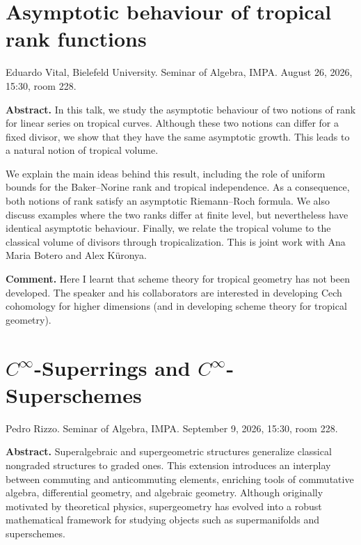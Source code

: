 \section{Asymptotic behaviour of tropical
rank functions}
\label{section-asymptotic-tropical-rank}

\noindent
Eduardo Vital, Bielefeld University.
Seminar of Algebra, IMPA.
August 26, 2026, 15:30, room 228.

\medskip\noindent
{\bf Abstract.} In this talk, we study the
asymptotic behaviour of two notions of rank
for linear series on tropical curves.
Although these two notions can differ for a
fixed divisor, we show that they have the
same asymptotic growth. This leads to a
natural notion of tropical volume.

We explain the main ideas behind this
result, including the role of uniform bounds
for the Baker--Norine rank and tropical
independence. As a consequence, both notions
of rank satisfy an asymptotic
Riemann--Roch formula. We also discuss
examples where the two ranks differ at
finite level, but nevertheless have
identical asymptotic behaviour. Finally, we
relate the tropical volume to the classical
volume of divisors through tropicalization.
This is joint work with Ana Maria Botero and
Alex K\"uronya.

\medskip\noindent
{\bf Comment.}
Here I learnt that scheme theory
for tropical geometry has not been
developed. The speaker and his collaborators
are interested in developing
Cech cohomology for higher dimensions
(and in developing scheme theory
for tropical geometry).

\section{\texorpdfstring
{$C^\infty$}{C-infinity}-Superrings and
\texorpdfstring
{$C^\infty$}{C-infinity}-Superschemes}
\label{section-rizzo-smooth-superrings}

\noindent
Pedro Rizzo.
Seminar of Algebra, IMPA.
September 9, 2026, 15:30, room 228.

\medskip\noindent
{\bf Abstract.}
Superalgebraic and supergeometric structures
generalize classical nongraded structures to
graded ones. This extension introduces an
interplay between commuting and anticommuting
elements, enriching tools of commutative
algebra, differential geometry, and algebraic
geometry. Although originally motivated by
theoretical physics, supergeometry has
evolved into a robust mathematical framework
for studying objects such as supermanifolds
and superschemes.

